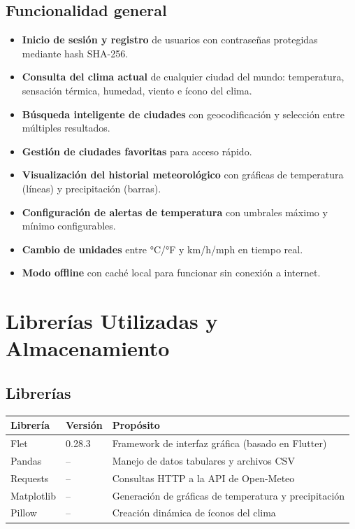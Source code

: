 \documentclass[12pt,a4paper]{article}
\begin{document}
\subsection{Funcionalidad general}
\begin{itemize}[itemsep=4pt]
    \item \textbf{Inicio de sesión y registro} de usuarios con contraseñas protegidas mediante hash SHA-256.
    \item \textbf{Consulta del clima actual} de cualquier ciudad del mundo: temperatura, sensación térmica, humedad, viento e ícono del clima.
    \item \textbf{Búsqueda inteligente de ciudades} con geocodificación y selección entre múltiples resultados.
    \item \textbf{Gestión de ciudades favoritas} para acceso rápido.
    \item \textbf{Visualización del historial meteorológico} con gráficas de temperatura (líneas) y precipitación (barras).
    \item \textbf{Configuración de alertas de temperatura} con umbrales máximo y mínimo configurables.
    \item \textbf{Cambio de unidades} entre °C/°F y km/h/mph en tiempo real.
    \item \textbf{Modo offline} con caché local para funcionar sin conexión a internet.
\end{itemize}
\section{Librerías Utilizadas y Almacenamiento}
\subsection{Librerías}
\begin{tabular}{|l|l|l|}
\hline
\textbf{Librería} & \textbf{Versión} & \textbf{Propósito} \\
\hline
Flet & 0.28.3 & Framework de interfaz gráfica (basado en Flutter) \\
Pandas & -- & Manejo de datos tabulares y archivos CSV \\
Requests & -- & Consultas HTTP a la API de Open-Meteo \\
Matplotlib & -- & Generación de gráficas de temperatura y precipitación \\
Pillow & -- & Creación dinámica de íconos del clima \\
\hline
\end{tabular}
\end{document}
